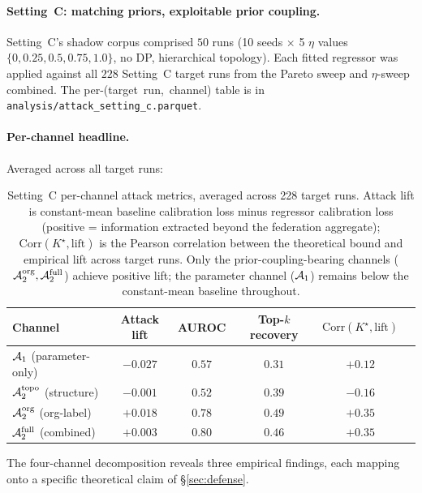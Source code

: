 \paragraph{Setting~C: matching priors, exploitable prior coupling.}
Setting~C's shadow corpus comprised $50$ runs (10 seeds $\times$
5 $\eta$ values $\{0, 0.25, 0.5, 0.75, 1.0\}$, no DP, hierarchical
topology). Each fitted regressor was applied against all $228$
Setting~C target runs from the Pareto sweep and $\eta$-sweep combined.
The per-(target~run,~channel) table is in
\texttt{analysis/attack\_setting\_c.parquet}.

\paragraph{Per-channel headline.}
Averaged across all target runs:

\begin{table}[h]
\centering
\begin{tabular}{@{}lccccc@{}}
\toprule
Channel & Attack lift & AUROC & Top-$k$ recovery & $\mathrm{Corr}(K^\star, \text{lift})$ \\
\midrule
$\mathcal{A}_1$ (parameter-only)         & $-0.027$ &  $0.57$ & $0.31$ & $+0.12$ \\
$\mathcal{A}_2^{\text{topo}}$ (structure) & $-0.001$ &  $0.52$ & $0.39$ & $-0.16$ \\
$\mathcal{A}_2^{\text{org}}$ (org-label)  & $+0.018$ &  $0.78$ & $0.49$ & $+0.35$ \\
$\mathcal{A}_2^{\text{full}}$ (combined)  & $+0.003$ &  $0.80$ & $0.46$ & $+0.35$ \\
\bottomrule
\end{tabular}
\caption{Setting~C \TADI per-channel attack metrics, averaged across
228 target runs. Attack lift is constant-mean baseline calibration loss
minus regressor calibration loss (positive = information extracted
beyond the federation aggregate); $\mathrm{Corr}(K^\star, \text{lift})$
is the Pearson correlation between the theoretical bound and empirical
lift across target runs. Only the prior-coupling-bearing channels
($\mathcal{A}_2^{\text{org}}, \mathcal{A}_2^{\text{full}}$) achieve positive lift;
the parameter channel ($\mathcal{A}_1$) remains below the constant-mean
baseline throughout.}
\label{tab:channels-c}
\end{table}

The four-channel decomposition reveals three empirical findings,
each mapping onto a specific theoretical claim of \S\ref{sec:defense}.

